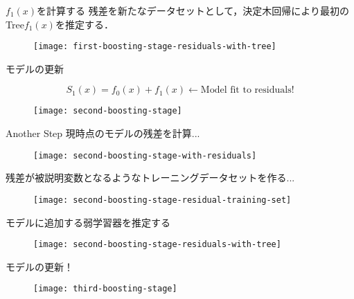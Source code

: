 \begin{frame}{$f_1(x)$を計算する}
残差を新たなデータセットとして，決定木回帰により最初のTree$f_1(x)$を推定する．

  \begin{figure}
    \texttt{[image: first-boosting-stage-residuals-with-tree]}
  \end{figure}

\end{frame}
%

\begin{frame}{モデルの更新}

$$S_1(x) = f_0(x) + f_1(x) \leftarrow \text{Model fit to residuals!}$$

  \begin{figure}
    \texttt{[image: second-boosting-stage]}
  \end{figure}
  
\end{frame}
%

\begin{frame}{Another Step}
現時点のモデルの残差を計算...

  \begin{figure}
    \texttt{[image: second-boosting-stage-with-residuals]}
  \end{figure}
  
\end{frame}
%

\begin{frame}
残差が被説明変数となるようなトレーニングデータセットを作る...

  \begin{figure}
    \texttt{[image: second-boosting-stage-residual-training-set]}
  \end{figure}
  
\end{frame}
%

\begin{frame}
モデルに追加する弱学習器を推定する

  \begin{figure}
    \texttt{[image: second-boosting-stage-residuals-with-tree]}
  \end{figure}
  
\end{frame}
%

\begin{frame}
モデルの更新！

  \begin{figure}
    \texttt{[image: third-boosting-stage]}
  \end{figure}
  
\end{frame}
%

